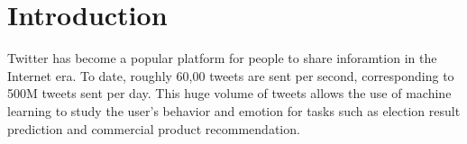 \section{Introduction} \label{sec:introduction}

Twitter has become a popular platform for people to share inforamtion in the Internet era. To date, roughly 60,00 tweets are sent per second, corresponding to 500M tweets sent per day. This huge volume of tweets allows the use of machine learning to study the user's behavior and emotion for tasks such as election result prediction and commercial product recommendation. 